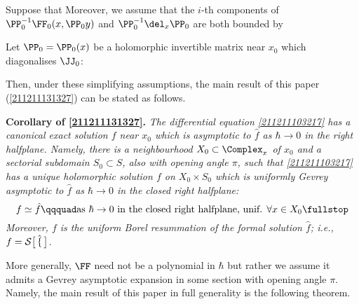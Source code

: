 \documentclass[11pt]{article}
\begin{document}
\HRule


Suppose that 
Moreover, we assume that the $i$-th components of $\PP_0^{-1} \FF_0 (x, \PP_0 y)$ and $\PP_0^{-1} \del_x \PP_0$ are both bounded by 

Let $\PP_0 = \PP_0 (x)$ be a holomorphic invertible matrix near $x_0$ which diagonalises $\JJ_0$:







Then, under these simplifying assumptions, the main result of this paper (\autoref{211211131327}) can be stated as follows.

\textbf{Corollary of \autoref{211211131327}.}
\textit{%
The differential equation \eqref{211211103217} has a canonical exact solution $f$ near $x_0$ which is asymptotic to $\hat{f}$ as $\hbar \to 0$ in the right halfplane.
Namely, there is a neighbourhood $X_0 \subset \Complex_x$ of $x_0$ and a sectorial subdomain $S_0 \subset S$, also with opening angle $\pi$, such that \eqref{211211103217} has a unique holomorphic solution $f$ on $X_0 \times S_0$ which is uniformly Gevrey asymptotic to $\hat{f}$ as $\hbar \to 0$ in the closed right halfplane:
\begin{equation}
\label{211211124352}
	f \simeq \hat{f}
\qqquad
	\text{as $\hbar \to 0$ in the closed right halfplane, unif. $\forall x \in X_0$\fullstop}
\end{equation}
Moreover, $f$ is the uniform Borel resummation of the formal solution $\hat{f}$; i.e., $f = \cal{S} \big[ \, \hat{f} \, \big]$.
}


More generally, $\FF$ need not be a polynomial in $\hbar$ but rather we assume it admits a Gevrey asymptotic expansion in some section with opening angle $\pi$.
Namely, the main result of this paper in full generality is the following theorem.
\end{document}
